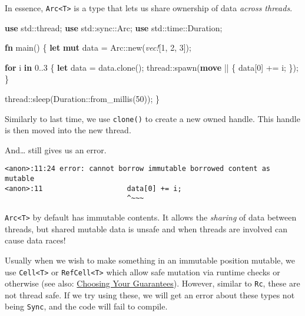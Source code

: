 \documentclass[a4paper,]{book}
\newenvironment{Shaded}{\begin{snugshade}}{\end{snugshade}}
\newcommand{\KeywordTok}[1]{\textcolor[rgb]{0.13,0.29,0.53}{\textbf{{#1}}}}
\newcommand{\DecValTok}[1]{\textcolor[rgb]{0.00,0.00,0.81}{{#1}}}
\newcommand{\PreprocessorTok}[1]{\textcolor[rgb]{0.56,0.35,0.01}{\textit{{#1}}}}
\newcommand{\NormalTok}[1]{{#1}}
\begin{document}
In essence, \texttt{Arc\textless{}T\textgreater{}} is a type that lets
us share ownership of data \emph{across threads}.

\begin{Shaded}
\begin{Highlighting}[]
\KeywordTok{use} \NormalTok{std::thread;}
\KeywordTok{use} \NormalTok{std::sync::Arc;}
\KeywordTok{use} \NormalTok{std::time::Duration;}

\KeywordTok{fn} \NormalTok{main() \{}
    \KeywordTok{let} \KeywordTok{mut} \NormalTok{data = Arc::new(}\PreprocessorTok{vec!}\NormalTok{[}\DecValTok{1}\NormalTok{, }\DecValTok{2}\NormalTok{, }\DecValTok{3}\NormalTok{]);}

    \KeywordTok{for} \NormalTok{i }\KeywordTok{in} \DecValTok{0.}\NormalTok{.}\DecValTok{3} \NormalTok{\{}
        \KeywordTok{let} \NormalTok{data = data.clone();}
        \NormalTok{thread::spawn(}\KeywordTok{move} \NormalTok{|| \{}
            \NormalTok{data[}\DecValTok{0}\NormalTok{] += i;}
        \NormalTok{\});}
    \NormalTok{\}}

    \NormalTok{thread::sleep(Duration::from_millis(}\DecValTok{50}\NormalTok{));}
\NormalTok{\}}
\end{Highlighting}
\end{Shaded}

Similarly to last time, we use \texttt{clone()} to create a new owned
handle. This handle is then moved into the new thread.

And\ldots{} still gives us an error.

\begin{verbatim}
<anon>:11:24 error: cannot borrow immutable borrowed content as mutable
<anon>:11                    data[0] += i;
                             ^~~~
\end{verbatim}

\texttt{Arc\textless{}T\textgreater{}} by default has immutable
contents. It allows the \emph{sharing} of data between threads, but
shared mutable data is unsafe and when threads are involved can cause
data races!

Usually when we wish to make something in an immutable position mutable,
we use \texttt{Cell\textless{}T\textgreater{}} or
\texttt{RefCell\textless{}T\textgreater{}} which allow safe mutation via
runtime checks or otherwise (see also:
\protect\hyperlink{sec--choosing-your-guarantees}{Choosing Your
Guarantees}). However, similar to \texttt{Rc}, these are not thread
safe. If we try using these, we will get an error about these types not
being \texttt{Sync}, and the code will fail to compile.
\end{document}
